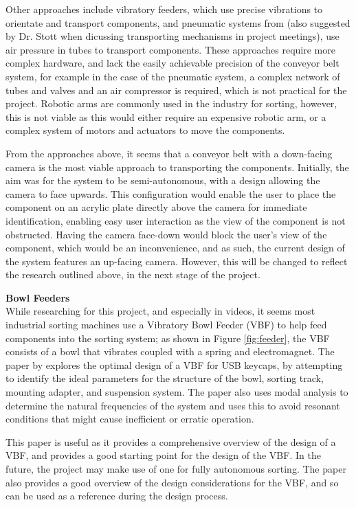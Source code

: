 Other approaches include vibratory feeders\cite{s21217280}, which use precise vibrations to orientate and transport components, and pneumatic systems from \citet{ASEC2023-16267} (also suggested by Dr. Stott when dicussing transporting mechanisms in project meetings), use air pressure in tubes to transport components.
These approaches require more complex hardware, and lack the easily achievable precision of the conveyor belt system, for example in the case of the pneumatic system, a complex network of tubes and valves and an air compressor
is required, which is not practical for the project. Robotic arms are commonly used in the industry for sorting, however, this is not viable as this would either require an expensive robotic arm, or a complex system of motors and actuators to move the components.

From the approaches above, it seems that a conveyor belt with a down-facing camera is the most viable approach to transporting the components. Initially, the aim was for the system to be semi-autonomous, with a design allowing the camera to face upwards.
This configuration would enable the user to place the component on an acrylic plate directly above the camera for immediate identification, enabling easy user interaction as the view of the component is not obstructed. 
Having the camera face-down would block the user's view of the component, which would be an inconvenience, and as such, the current design of the system features an up-facing camera. However, 
this will be changed to reflect the research outlined above, in the next stage of the project.

\noindent
\textbf{Bowl Feeders} \\
While researching for this project, and especially in videos\cite{videobowlfeeder}, it seems most industrial sorting machines use a Vibratory Bowl Feeder (VBF) to help feed components into the sorting system;
as shown in Figure \ref*{fig:feeder}, the VBF consists of a bowl that vibrates coupled with a spring and electromagnet.
The paper by \citet{nam2019design} explores the optimal design of a VBF for USB keycaps, by attempting to identify the ideal parameters for the structure of the bowl,
sorting track, mounting adapter, and suspension system. The paper also uses modal analysis to determine the natural frequencies of the system and uses this to
avoid resonant conditions that might cause inefficient or erratic operation.

This paper is useful as it provides a comprehensive overview of the design of a VBF, and provides a good starting point for the design of the VBF. In the future,
the project may make use of one for fully autonomous sorting. The paper also provides a good overview of the design considerations for the VBF, and so can be used as a reference
during the design process.

